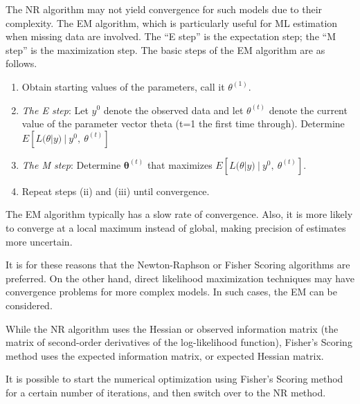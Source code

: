 \documentclass[
  9pt,
  ignorenonframetext,
]{beamer}
\begin{document}
\begin{frame}{}
\protect\hypertarget{section-2}{}
The NR algorithm may not yield convergence for such models due to their
complexity. The EM algorithm, which is particularly useful for ML
estimation when missing data are involved. The ``E step'' is the
expectation step; the ``M step'' is the maximization step. The basic
steps of the EM algorithm are as follows.

\begin{enumerate}
\item
  Obtain starting values of the parameters, call it \(\theta^{(1)}\).
\item
  \emph{The E step}: Let \(y^0\) denote the observed data and let
  \(\theta^{(t)}\) denote the current value of the parameter vector
  theta (t=1 the first time through). Determine
  \(E[L(\theta |y)\ |\ y^0,\ \theta ^{(t)}]\)
\item
  \emph{The M step}: Determine \(\pmb \theta^{(t)}\) that maximizes
  \(E[L(\theta |y)\ |\ y^0,\ \theta ^{(t)}]\).
\item
  Repeat steps (ii) and (iii) until convergence.
\end{enumerate}
\end{frame}

\begin{frame}{}
\protect\hypertarget{section-3}{}
The EM algorithm typically has a slow rate of convergence. Also, it is
more likely to converge at a local maximum instead of global, making
precision of estimates more uncertain.

It is for these reasons that the Newton-Raphson or Fisher Scoring
algorithms are preferred. On the other hand, direct likelihood
maximization techniques may have convergence problems for more complex
models. In such cases, the EM can be considered.

While the NR algorithm uses the Hessian or observed information matrix
(the matrix of second-order derivatives of the log-likelihood function),
Fisher's Scoring method uses the expected information matrix, or
expected Hessian matrix.

It is possible to start the numerical optimization using Fisher's
Scoring method for a certain number of iterations, and then switch over
to the NR method.
\end{frame}
\end{document}
